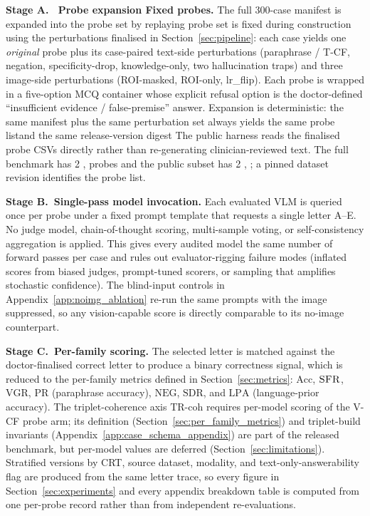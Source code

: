 \documentclass{article}
\newcommand{\sfr}{\textsc{SFR}}
\providecommand{\DIFaddtex}[1]{{\protect\color{blue} \sf #1}} %
\providecommand{\DIFdeltex}[1]{{\protect\color{red} \scriptsize #1}} %
\providecommand{\DIFaddbegin}{} %
\providecommand{\DIFaddend}{} %
\providecommand{\DIFdelbegin}{} %
\providecommand{\DIFdelend}{} %
\providecommand{\DIFadd}[1]{\texorpdfstring{\DIFaddtex{#1}}{#1}} %
\providecommand{\DIFdel}[1]{\texorpdfstring{\DIFdeltex{#1}}{}} %
\begin{document}
\textbf{Stage A.\ \DIFdelbegin \DIFdel{Probe expansion}\DIFdelend \DIFaddbegin \DIFadd{Fixed probes}\DIFaddend .} The \DIFaddbegin \DIFadd{full }\DIFaddend 300-case \DIFdelbegin \DIFdel{manifest is expanded into the probe set by replaying }\DIFdelend \DIFaddbegin \DIFadd{probe set is fixed during construction using }\DIFaddend the perturbations finalised in Section~\ref{sec:pipeline}: each case yields one \emph{original} probe plus its case-paired text-side perturbations (paraphrase / T-CF, negation, specificity-drop, knowledge-only, two hallucination traps) and three image-side perturbations (ROI-masked, ROI-only, lr\_flip). Each probe is wrapped in a five-option MCQ container whose explicit refusal option is the doctor-defined ``insufficient evidence / false-premise'' answer. \DIFdelbegin \DIFdel{Expansion is deterministic: the same manifest plus the same perturbation set always yields the same probe listand the same release-version digest}\DIFdelend \DIFaddbegin \DIFadd{The public harness reads the finalised probe CSVs directly rather than re-generating clinician-reviewed text. The full benchmark has 2}{\DIFadd{,}}\DIFadd{556 probes and the public subset has 2}{\DIFadd{,}}\DIFadd{002; a pinned dataset revision identifies the probe list}\DIFaddend .

\textbf{Stage B.\ Single-pass model invocation.} Each evaluated VLM is queried once per probe under a fixed prompt template that requests a single letter A--E. No judge model, chain-of-thought scoring, multi-sample voting, or self-consistency aggregation is applied. This gives every audited model the same number of forward passes per case and rules out evaluator-rigging failure modes (inflated scores from biased judges, prompt-tuned scorers, or sampling that amplifies stochastic confidence). The blind-input controls in Appendix~\ref{app:noimg_ablation} re-run the same prompts with the image suppressed, so any vision-capable score is directly comparable to its no-image counterpart.

\textbf{Stage C.\ Per-family scoring.} The selected letter is matched against the doctor-finalised correct letter to produce a binary correctness signal, which is reduced to the per-family metrics defined in Section~\ref{sec:metrics}: $\mathrm{Acc}$, $\sfr$, $\mathrm{VGR}$, $\mathrm{PR}$ (paraphrase accuracy), $\mathrm{NEG}$, $\mathrm{SDR}$, and $\mathrm{LPA}$ (language-prior accuracy). The triplet-coherence axis $\mathrm{TR\text{-}coh}$ requires per-model scoring of the V-CF probe arm; its definition (Section~\ref{sec:per_family_metrics}) and triplet-build invariants (Appendix~\ref{app:case_schema_appendix}) are part of the released benchmark, but per-model values are deferred (Section~\ref{sec:limitations}). Stratified versions by CRT, source dataset, modality, and text-only-answerability flag are produced from the same letter trace, so every figure in Section~\ref{sec:experiments} and every appendix breakdown table is computed from one per-probe record rather than from independent re-evaluations.
\end{document}
